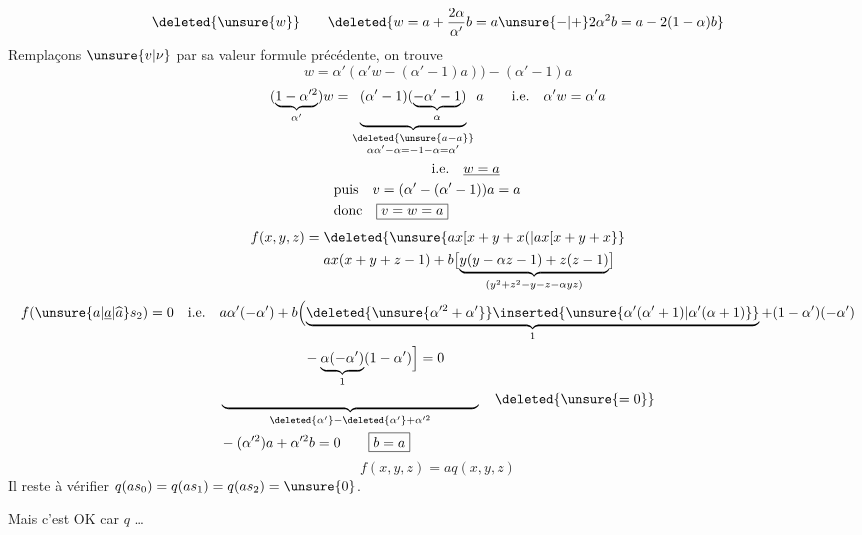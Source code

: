 \[
\deleted{\unsure{w}}\qquad\deleted{w=a+\frac{2\alpha}{\alpha'}b=a\unsure{-|+}2\alpha^2b=a-2(1-\alpha)b}
\]
Remplaçons $\unsure{v|\nu}$ par sa valeur  formule précédente, on trouve
\[
w=\alpha'(\alpha'w-(\alpha'-1)a))-(\alpha'-1)a
\]
\[
\begin{aligned}
(\underbrace{1-\alpha^{\prime 2}}_{\alpha'})w
&=\underbrace{(\alpha'-1)(\underbrace{-\alpha'-1}_{\alpha})}_{\substack{\deleted{\unsure{a-a}}\\\alpha\alpha'-\alpha=-1-\alpha=\alpha'}}a
\qquad\text{i.e.}\quad\alpha'w=\alpha'a\\
&\hspace{7em}\text{i.e.}\quad\underline{w=a}\\
&\text{puis}\quad v=(\alpha'-(\alpha'-1))a=a\\
&\text{donc}\quad\boxed{v=w=a}
\end{aligned}
\]
\[
\begin{aligned}
f(x,y,z)={}&\deleted{\unsure{ax[x+y+x(|ax[x+y+x}}\\
&ax(x+y+z-1)+b\bigl[\underbrace{y(y-\alpha z-1)+z(z-1)}_{(y^2+z^2-y-z-\alpha yz)}\bigr]
\end{aligned}
\]
\[
\begin{aligned}
f(\unsure{a|\underline a|\widehat a}s_2)=0\quad\text{i.e.}\quad
&a\alpha'(-\alpha')+b\Bigl(\underbrace{\deleted{\unsure{\alpha^{\prime 2}+\alpha'}}\inserted{\unsure{\alpha'(\alpha'+1)|\alpha'(\alpha+1)}}}_{1}+(1-\alpha')(-\alpha')\\
&\hspace{6em}-\underbrace{\alpha(-\alpha')}_{1}(1-\alpha')\Bigr]=0\\
&\underbrace{\hphantom{\alpha^{\prime 2}+\alpha'+(1-\alpha')(-\alpha')-\alpha(-\alpha')(1-\alpha')}}_{\deleted{\alpha'}-\deleted{\alpha'}+\alpha^{\prime 2}}\quad\deleted{\unsure{=0}}\\
&-(\alpha^{\prime 2})a+\alpha^{\prime 2}b=0\qquad\boxed{b=a}
\end{aligned}
\]
\[
f(x,y,z)=aq(x,y,z)
\]
Il reste à vérifier $q(as_0)=q(as_1)=q(as_2)=\unsure{0}$.

Mais c'est OK car $q$ \ldots
